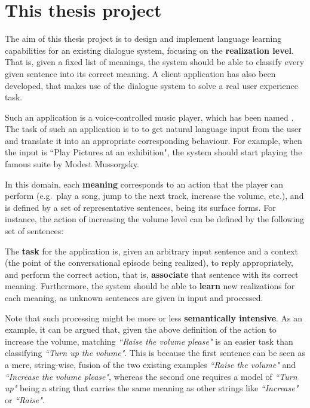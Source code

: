 
\section{This thesis project} \label{ch:intro:project}

The aim of this thesis project is to design and implement language learning capabilities for an existing dialogue system, focusing on the \textbf{realization level}. That is, given a fixed list of meanings, the system should be able to classify every given sentence into its correct meaning. A client application has also been developed, that makes use of the dialogue system to solve a real user experience task.

Such an application is a voice-controlled music player, which has been named \textbf{\pname}. The task of such an application is to to get natural language input from the user and translate it into an appropriate corresponding behaviour. For example, when the input is ``Play Pictures at an exhibition", the system should start playing the famous suite by Modest Mussorgsky.

In this domain, each \textbf{meaning} corresponds to an action that the player can perform (e.g.\ play a song, jump to the next track, increase the volume, etc.), and is defined by a set of representative sentences, being its surface forms. For instance, the action of increasing the volume level can be defined by the following set of sentences:
\vspace{-0.6cm}
\vspace{-0.6cm}
\vspace{-0.6cm}

The \textbf{task} for the application is, given an arbitrary input sentence and a context (the point of the conversational episode being realized), to reply appropriately, and perform the correct action, that is, \textbf{associate} that sentence with its correct meaning. Furthermore, the system should be able to \textbf{learn} new realizations for each meaning, as unknown sentences are given in input and processed.

Note that such processing might be more or less \textbf{semantically intensive}. As an example, it can be argued that, given the above definition of the action to increase the volume, matching \textit{``Raise the volume please"} is an easier task than classifying \textit{``Turn up the volume"}. This is because the first sentence can be seen as a mere, string-wise, fusion of the two existing examples \textit{``Raise the volume"} and \textit{``Increase the volume please"}, whereas the second one requires a model of \textit{``Turn up"} being a string that carries the same meaning as other strings like \textit{``Increase"} or \textit{``Raise"}.

